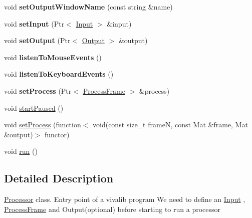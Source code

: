 \begin{DoxyCompactItemize}
\item 
void {\bfseries set\+Output\+Window\+Name} (const string \&name)\hypertarget{classviva_1_1_processor_a9e572aff063dfce565b53c4045c9ca1c}{}\label{classviva_1_1_processor_a9e572aff063dfce565b53c4045c9ca1c}

\item 
void {\bfseries set\+Input} (Ptr$<$ \hyperlink{classviva_1_1_input}{Input} $>$ \&input)\hypertarget{classviva_1_1_processor_a49d307c184c1f465ce472dd7c3d0d03e}{}\label{classviva_1_1_processor_a49d307c184c1f465ce472dd7c3d0d03e}

\item 
void {\bfseries set\+Output} (Ptr$<$ \hyperlink{classviva_1_1_output}{Output} $>$ \&output)\hypertarget{classviva_1_1_processor_a6411ad40ecad80d1585240c2583f5508}{}\label{classviva_1_1_processor_a6411ad40ecad80d1585240c2583f5508}

\item 
void {\bfseries listen\+To\+Mouse\+Events} ()\hypertarget{classviva_1_1_processor_a6467b7f49fbc075896823849a6b201ad}{}\label{classviva_1_1_processor_a6467b7f49fbc075896823849a6b201ad}

\item 
void {\bfseries listen\+To\+Keyboard\+Events} ()\hypertarget{classviva_1_1_processor_a9410f5f51eb4dd10f895db7502039760}{}\label{classviva_1_1_processor_a9410f5f51eb4dd10f895db7502039760}

\item 
void {\bfseries set\+Process} (Ptr$<$ \hyperlink{classviva_1_1_process_frame}{Process\+Frame} $>$ \&process)\hypertarget{classviva_1_1_processor_aab5f8e5a7b6f5356d11bbd39b1844440}{}\label{classviva_1_1_processor_aab5f8e5a7b6f5356d11bbd39b1844440}

\item 
void \hyperlink{classviva_1_1_processor_a9ab7ae5d6ed7720f94ee11e8b491dda2}{start\+Paused} ()
\item 
void \hyperlink{classviva_1_1_processor_a4c610fda2a3bf19feb7b7fd65b2ff6b0}{set\+Process} (function$<$ void(const size\+\_\+t frameN, const Mat \&frame, Mat \&output)$>$ functor)
\item 
void \hyperlink{classviva_1_1_processor_a073f5e9ea6a3557c217d67ab392e5852}{run} ()
\end{DoxyCompactItemize}


\subsection{Detailed Description}
\hyperlink{classviva_1_1_processor}{Processor} class. Entry point of a vivalib program We need to define an \hyperlink{classviva_1_1_input}{Input} , \hyperlink{classviva_1_1_process_frame}{Process\+Frame} and Output(optional) before starting to run a processor 


